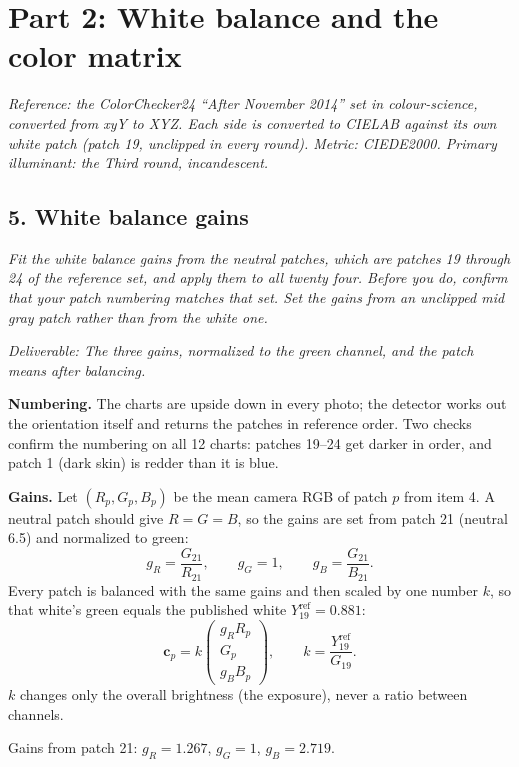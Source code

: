 \documentclass[11pt]{article}
\newcommand{\task}[3]{\subsection*{#1}{\sloppy\noindent\textit{#2}\par}\smallskip\noindent\textit{Deliverable: #3}\par\medskip}
\begin{document}
\section*{Part 2: White balance and the color matrix}

\noindent\textit{Reference: the ColorChecker24 ``After November 2014'' set in colour-science, converted from xyY to XYZ. Each side is converted to CIELAB against its own white patch (patch 19, unclipped in every round). Metric: CIEDE2000. Primary illuminant: the Third round, incandescent.}\par\medskip

\task{5. White balance gains}
{Fit the white balance gains from the neutral patches, which are patches 19 through 24 of the reference set, and apply them to all twenty four. Before you do, confirm that your patch numbering matches that set. Set the gains from an unclipped mid gray patch rather than from the white one.}
{The three gains, normalized to the green channel, and the patch means after balancing.}

\noindent\textbf{Numbering.} The charts are upside down in every photo; the detector works out the orientation itself and returns the patches in reference order. Two checks confirm the numbering on all 12 charts: patches 19--24 get darker in order, and patch 1 (dark skin) is redder than it is blue.

\noindent\textbf{Gains.} Let $(R_p, G_p, B_p)$ be the mean camera RGB of patch $p$ from item 4. A neutral patch should give $R = G = B$, so the gains are set from patch 21 (neutral 6.5) and normalized to green:
\[
g_R = \frac{G_{21}}{R_{21}}, \qquad g_G = 1, \qquad g_B = \frac{G_{21}}{B_{21}}.
\]
Every patch is balanced with the same gains and then scaled by one number $k$, so that white's green equals the published white $Y_{19}^{\text{ref}} = 0.881$:
\[
\mathbf{c}_p = k \begin{pmatrix} g_R R_p \\ G_p \\ g_B B_p \end{pmatrix},
\qquad
k = \frac{Y_{19}^{\text{ref}}}{G_{19}}.
\]
$k$ changes only the overall brightness (the exposure), never a ratio between channels.

\noindent Gains from patch 21: $g_R = 1.267$, $g_G = 1$, $g_B = 2.719$.
\end{document}
